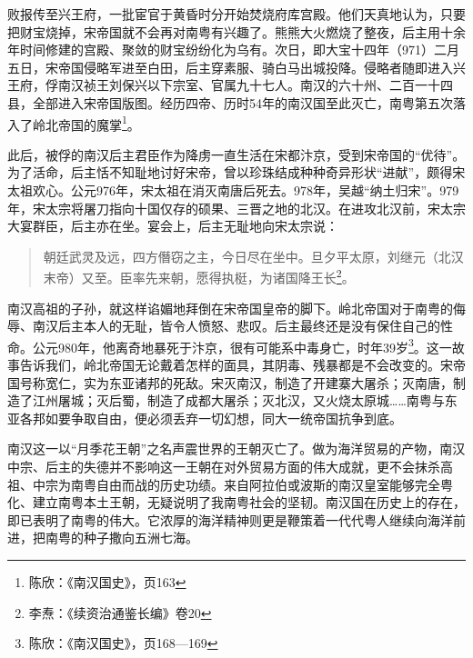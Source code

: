 败报传至兴王府，一批宦官于黄昏时分开始焚烧府库宫殿。他们天真地认为，只要把财宝烧掉，宋帝国就不会再对南粤有兴趣了。熊熊大火燃烧了整夜，后主用十余年时间修建的宫殿、聚敛的财宝纷纷化为乌有。次日，即大宝十四年（971）二月五日，宋帝国侵略军进至白田，后主穿素服、骑白马出城投降。侵略者随即进入兴王府，俘南汉祯王刘保兴以下宗室、官属九十七人。南汉的六十州、二百一十四县，全部进入宋帝国版图。经历四帝、历时54年的南汉国至此灭亡，南粤第五次落入了岭北帝国的魔掌\footnote{陈欣：《南汉国史》，页163}。

此后，被俘的南汉后主君臣作为降虏一直生活在宋都汴京，受到宋帝国的“优待”。为了活命，后主恬不知耻地讨好宋帝，曾以珍珠结成种种奇异形状“进献”，颇得宋太祖欢心。公元976年，宋太祖在消灭南唐后死去。978年，吴越“纳土归宋”。979年，宋太宗将屠刀指向十国仅存的硕果、三晋之地的北汉。在进攻北汉前，宋太宗大宴群臣，后主亦在坐。宴会上，后主无耻地向宋太宗说：

\begin{quote}
	朝廷武灵及远，四方僭窃之主，今日尽在坐中。旦夕平太原，刘继元（北汉末帝）又至。臣率先来朝，愿得执梃，为诸国降王长\footnote{李焘：《续资治通鉴长编》卷20}。
\end{quote}

南汉高祖的子孙，就这样谄媚地拜倒在宋帝国皇帝的脚下。岭北帝国对于南粤的侮辱、南汉后主本人的无耻，皆令人愤怒、悲叹。后主最终还是没有保住自己的性命。公元980年，他离奇地暴死于汴京，很有可能系中毒身亡，时年39岁\footnote{陈欣：《南汉国史》，页168—169}。这一故事告诉我们，岭北帝国无论戴着怎样的面具，其阴毒、残暴都是不会改变的。宋帝国号称宽仁，实为东亚诸邦的死敌。宋灭南汉，制造了开建寨大屠杀；灭南唐，制造了江州屠城；灭后蜀，制造了成都大屠杀；灭北汉，又火烧太原城……南粤与东亚各邦如要争取自由，便必须丢弃一切幻想，同大一统帝国抗争到底。

南汉这一以“月季花王朝”之名声震世界的王朝灭亡了。做为海洋贸易的产物，南汉中宗、后主的失德并不影响这一王朝在对外贸易方面的伟大成就，更不会抹杀高祖、中宗为南粤自由而战的历史功绩。来自阿拉伯或波斯的南汉皇室能够完全粤化、建立南粤本土王朝，无疑说明了我南粤社会的坚韧。南汉国在历史上的存在，即已表明了南粤的伟大。它浓厚的海洋精神则更是鞭策着一代代粤人继续向海洋前进，把南粤的种子撒向五洲七海。


